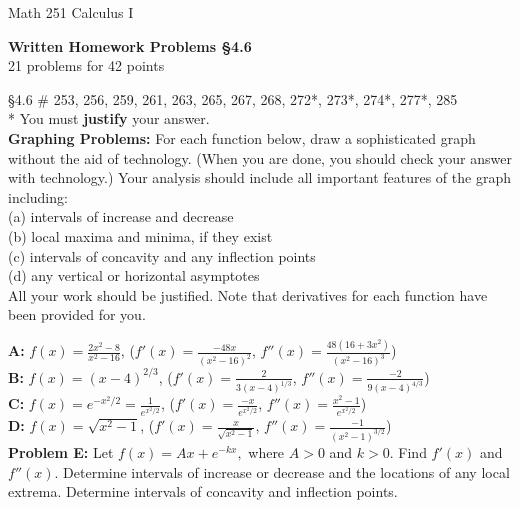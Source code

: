 \documentclass[11pt]{report}
\theoremstyle{plain}
\begin{document}
\hfill Math 251 Calculus I
\begin{center}
\Large{\textbf{Written Homework Problems \S 4.6}} \\
21 problems for 42 points\\
\end{center}

\begin{description}
\item{\S 4.6} \# 253, 256, 259, 261, 263, 265, 267, 268, 272*, 273*, 274*, 277*, 285\\

* You must \textbf{justify} your answer.\\

\textbf{Graphing Problems:} For each function below, draw a sophisticated graph without the aid of technology. (When you are done, you should check your answer with technology.) Your analysis should include all important features of the graph including:\\
(a) intervals of increase and decrease\\
(b) local maxima and minima, if they exist\\
(c) intervals of concavity and any inflection points\\
(d) any vertical or horizontal asymptotes\\

All your work should be justified. Note that derivatives for each function have been provided for you.

\textbf{A:} $\displaystyle f(x)=\frac{2x^2-8}{x^2-16}$, \quad ($\displaystyle f'(x)=\frac{-48x}{(x^2-16)^2}$,  \quad $\displaystyle f''(x)=\frac{48(16+3x^2)}{(x^2-16)^3}$)  \\
\textbf{B:} $\displaystyle f(x)=(x-4)^{2/3}$,  \quad  ($\displaystyle f'(x)=\frac{2}{3(x-4)^{1/3}}$,  \quad $\displaystyle f''(x)=\frac{-2}{9(x-4)^{4/3}}$)\\
\textbf{C:} $\displaystyle f(x)=e^{-x^2/2}=\frac{1}{e^{x^2/2}}$,  \quad  ($\displaystyle f'(x)=\frac{-x}{e^{x^2/2}}$,  \quad $\displaystyle f''(x)=\frac{x^2-1}{e^{x^2/2}}$)\\
\textbf{D:} $\displaystyle f(x)=\sqrt{x^2-1}$,  \quad ($\displaystyle f'(x)=\frac{x}{\sqrt{x^2-1}}$, \quad  $\displaystyle f''(x)=\frac{-1}{(x^2-1)^{3/2}}$) \\


\textbf{Problem E:} Let $f(x)=Ax+e^{-kx},$ where $A>0$ and $k>0.$ Find $f'(x)$ and $f''(x).$ Determine intervals of increase or decrease and the locations of any local extrema. Determine intervals of concavity and inflection points.




\end{description}
\end{document}
